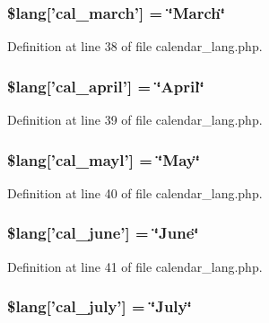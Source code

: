\subsubsection[{\$lang}]{\setlength{\rightskip}{0pt plus 5cm}\$lang['cal\-\_\-march'] = \char`\"{}March\char`\"{}}\label{calendar__lang_8php_af69ae8067fe6af9913575c2338bdcb00}


Definition at line 38 of file calendar\-\_\-lang.\-php.

\subsubsection[{\$lang}]{\setlength{\rightskip}{0pt plus 5cm}\$lang['cal\-\_\-april'] = \char`\"{}April\char`\"{}}\label{calendar__lang_8php_a91b47019689ab8d459212335c8bb558f}


Definition at line 39 of file calendar\-\_\-lang.\-php.

\subsubsection[{\$lang}]{\setlength{\rightskip}{0pt plus 5cm}\$lang['cal\-\_\-mayl'] = \char`\"{}May\char`\"{}}\label{calendar__lang_8php_a000c61063bbbaeda4e1e0f81717cf6f2}


Definition at line 40 of file calendar\-\_\-lang.\-php.

\subsubsection[{\$lang}]{\setlength{\rightskip}{0pt plus 5cm}\$lang['cal\-\_\-june'] = \char`\"{}June\char`\"{}}\label{calendar__lang_8php_acf04877cbc6934c38186bfaad8f7c4f0}


Definition at line 41 of file calendar\-\_\-lang.\-php.

\subsubsection[{\$lang}]{\setlength{\rightskip}{0pt plus 5cm}\$lang['cal\-\_\-july'] = \char`\"{}July\char`\"{}}\label{calendar__lang_8php_a067d03b1260e590cabb18e68c08f3868}


